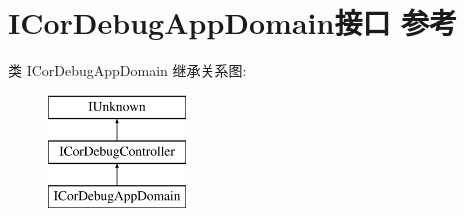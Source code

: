 \hypertarget{interface_i_cor_debug_app_domain}{}\section{I\+Cor\+Debug\+App\+Domain接口 参考}
\label{interface_i_cor_debug_app_domain}
类 I\+Cor\+Debug\+App\+Domain 继承关系图\+:\begin{figure}[H]
\begin{center}
\leavevmode
\includegraphics[height=3.000000cm]{interface_i_cor_debug_app_domain}
\end{center}
\end{figure}

